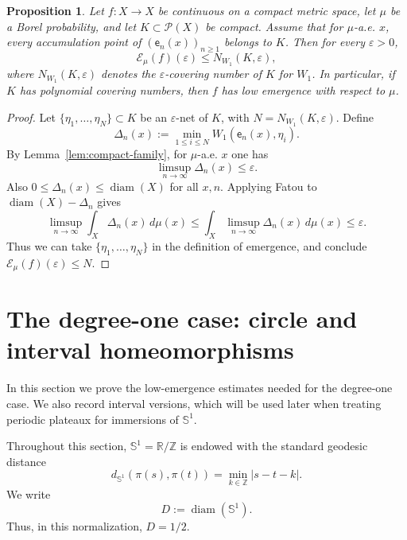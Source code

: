 \documentclass[12pt,a4paper,twoside]{article}
\theoremstyle{plain}
\newtheorem{proposition}[theorem]{Proposition}
\theoremstyle{definition}
\newcommand{\T}{{\mathbb{S}^1}}
\newcommand{\cP}{{\mathcal P}}
\newcommand{\eps}{\varepsilon}
\newcommand{\emp}{\mathsf e}
\newcommand{\Wone}{W_1}
\newcommand{\diam}{\operatorname{diam}}
\begin{document}
	\begin{proposition}\label{prop:compact-family-bound}
		Let $f\colon X\to X$ be continuous on a compact metric space, let $\mu$ be a Borel probability,
		and let $K\subset \cP(X)$ be compact.
		Assume that for $\mu$-a.e. $x$, every accumulation point of $(\emp_n(x))_{n\ge1}$ belongs to $K$.
		Then for every $\eps>0$,
		\[
		\mathcal{E}_\mu(f)(\eps)\le N_{\Wone}(K,\eps),
		\]
		where $N_{\Wone}(K,\eps)$ denotes the $\eps$-covering number of $K$ for $\Wone$.
		In particular, if $K$ has polynomial covering numbers, then $f$ has low emergence with respect
		to $\mu$.
	\end{proposition}
	
	\begin{proof}
		Let $\{\eta_1,\dots,\eta_N\}\subset K$ be an $\eps$-net of $K$, with
		$N=N_{\Wone}(K,\eps)$. Define
		\[
		\Delta_n(x):=\min_{1\le i\le N}\Wone(\emp_n(x),\eta_i).
		\]
		By Lemma~\ref{lem:compact-family}, for $\mu$-a.e. $x$ one has
		\[
		\limsup_{n\to\infty}\Delta_n(x)\le \eps.
		\]
		Also $0\le \Delta_n(x)\le \diam(X)$ for all $x,n$.
		Applying Fatou to $\diam(X)-\Delta_n$ gives
		\[
		\limsup_{n\to\infty}\int_X\Delta_n(x)\,d\mu(x)
		\le
		\int_X \limsup_{n\to\infty}\Delta_n(x)\,d\mu(x)
		\le \eps.
		\]
		Thus we can take $\{\eta_1,\dots,\eta_N\}$ in the definition of emergence,
		and conclude $\mathcal{E}_\mu(f)(\eps)\le N$.
	\end{proof}

\section{The degree-one case: circle and interval homeomorphisms}

In this section we prove the low-emergence estimates needed for the
degree-one case. We also record interval versions, which will be used later
when treating periodic plateaux for immersions of $\T$.

Throughout this section, \(\mathbb S^1=\mathbb R/\mathbb Z\) is endowed with
the standard geodesic distance
\[
d_{\mathbb S^1}(\pi(s),\pi(t))
=
\min_{k\in\mathbb Z}|s-t-k|.
\]
We write
\[
D:=\diam(\mathbb S^1).
\]
Thus, in this normalization, \(D=1/2\).

\end{document}
